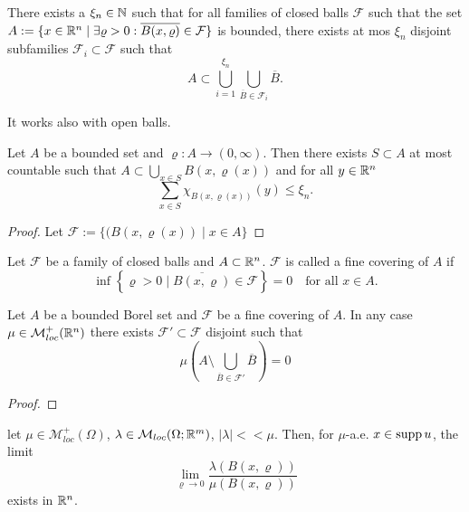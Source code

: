 \begin{theorem}
There exists a $\xi_n \in \mathbb{N}$ such that for all families of closed balls
$\mathcal{F}$ such that the set 
$A: = \{ x \in \mathbb{R}^n \mid \exists \varrho > 0 : \overline{B(x,\varrho)} \in
\mathcal{F}\}$ is bounded, there exists at mos $\xi_n$ disjoint subfamilies
$\mathcal{F}_i \subset \mathcal{F}$ such that 
\[
A \subset \bigcup_{i=1}^{\xi_n} \bigcup_{\overline{B} \in \mathcal{F}_i}
\overline{B}.
\]
\end{theorem}

\begin{remark}
It works also with open balls. 
\end{remark}

\begin{theorem}
Let $A$ be a bounded set and $\varrho : A \to (0,\infty)$. Then there exists $S
\subset A$ at most countable such that 
\(
A \subset \bigcup_{x\in S} B(x,\varrho(x)) 
\)
and for all $y \in \mathbb{R}^n$
\[
\sum_{x \in S} \chi_{B(x,\varrho(x))}(y) \leq \xi_n.
\]
\end{theorem}
\begin{proof}
Let $\mathcal{F} := \{(B(x,\varrho(x)) \mid x \in A\}$ \TODO
\end{proof}

\begin{definition}
Let $\mathcal{F}$ be a family of closed balls and $A \subset \mathbb{R}^n$.
$\mathcal{F}$ is called a fine covering of $A$ if 
\[
\inf \left\{ \varrho > 0 \mid \overline{B(x,\varrho)} \in \mathcal{F}\right \} =
0 \quad \text{for all $x\in A$}.
\]
\end{definition}

\begin{theorem}[Vitali]
Let $A$ be a bounded Borel set and $\mathcal{F}$ be a fine covering of $A$. In
any case $\mu \in \mathcal{M}^+_{loc}(\mathbb{R}^n)$ there exists $\mathcal{F}' \subset
\mathcal{F}$ disjoint such that 
\[
\mu \left( A \setminus \bigcup_{\overline{B}
\in \mathcal{F}'} \overline{B} \right) = 0
\]
\end{theorem}
\begin{proof}
\TODO
\end{proof}

\begin{theorem}
let $\mu \in \mathcal{M}^+_{loc}(\Omega)$, $\lambda \in
\mathcal{M}_{loc}(\Omega;\mathbb{R}^m)$, $|\lambda| << \mu$. Then, for $\mu$-a.e. $x \in
\operatorname{supp} u$, the limit 
\[
\lim_{\varrho \to 0} \frac{\lambda(B(x,\varrho))}{\mu(B(x,\varrho))}
\]
exists in $\mathbb{R}^n$.
\end{theorem}


